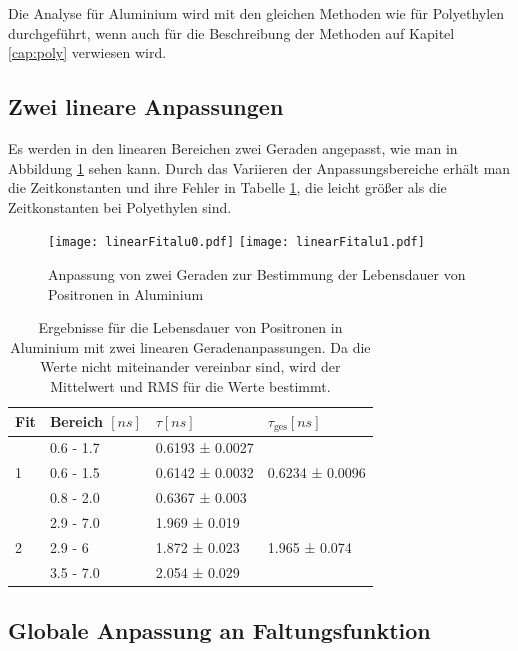 \documentclass[a4paper,12pt]{article}
\begin{document}
Die Analyse für Aluminium wird mit den gleichen Methoden wie für Polyethylen durchgeführt, wenn auch für die
Beschreibung der Methoden auf Kapitel \ref{cap:poly} verwiesen wird.
\subsection{Zwei lineare Anpassungen}
Es werden in den linearen Bereichen zwei Geraden angepasst, wie man in Abbildung
\ref{fig:dualLinearFitalu} sehen kann. Durch das Variieren der Anpassungsbereiche erhält man
die Zeitkonstanten und ihre Fehler in Tabelle \ref{tab:linearAlu}, die leicht größer als die
Zeitkonstanten bei Polyethylen sind.
\begin{figure}
	\texttt{[image: linearFitalu0.pdf]}
	\texttt{[image: linearFitalu1.pdf]}
	\caption{Anpassung von zwei Geraden zur Bestimmung der Lebensdauer von Positronen in Aluminium}
	\label{fig:dualLinearFitalu}
\end{figure}

\begin{table}[h]
	\begin{tabular}{l |l l ||l}
			Fit& Bereich $[\si{ns}]$ & $τ [\si{ns}]$ & $τ_\text{ges} [\si{ns}]$ \\
		\hline
		\multirow{3}{*}{1} & 0.6 - 1.7 &  0.6193 ± 0.0027   &\multirow{3}{*}{  0.6234 ± 0.0096}\\
	 & 0.6 - 1.5 &  0.6142 ± 0.0032   &\\
	 & 0.8 - 2.0 &  0.6367 ± 0.003   &\\
	 \hline
	 \multirow{3}{*}{2}  & 2.9 - 7.0 &  1.969 ± 0.019   &\multirow{3}{*}{1.965 ± 0.074 }\\
	 & 2.9 - 6 &  1.872 ± 0.023   &\\
	 & 3.5 - 7.0 &  2.054 ± 0.029   &
	\end{tabular}
	\centering
	\caption{Ergebnisse für die Lebensdauer von Positronen in Aluminium mit zwei linearen
		Geradenanpassungen. Da die Werte nicht miteinander vereinbar sind, wird der Mittelwert und
	RMS für die Werte bestimmt.}
	\label{tab:linearAlu}
\end{table}
\FloatBarrier

\subsection{Globale Anpassung an Faltungsfunktion}
\end{document}
